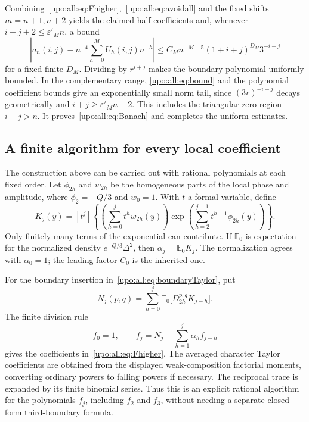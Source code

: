 \documentclass[11pt,letterpaper]{article}
\theoremstyle{remark}\newtheorem{remark}[theorem]{Remark}
\numberwithin{equation}{section}
\newcommand{\E}{\mathbb E}
\begin{document}
Combining~\eqref{upo:all:eq:Fhigher},~\eqref{upo:all:eq:avoidall} and the fixed shifts
$m=n+1,n+2$ yields the claimed half coefficients and, whenever
$i+j+2\le\varepsilon'_M n$, a bound
\[
\left|a_n(i,j)-n^{-4}\sum_{h=0}^M U_h(i,j)n^{-h}\right|
 \le C_Mn^{-M-5}(1+i+j)^{D_M}3^{-i-j}
\]
for a fixed finite $D_M$. Dividing by $r^{i+j}$ makes the boundary
polynomial uniformly bounded. In the complementary range,
\eqref{upo:all:eq:bound} and the polynomial coefficient bounds give an
exponentially small norm tail, since $(3r)^{-i-j}$ decays geometrically
and $i+j\ge\varepsilon'_Mn-2$. This includes the triangular zero region
$i+j>n$. It proves~\eqref{upo:all:eq:Banach} and completes the uniform estimates.


\subsection{A finite algorithm for every local coefficient}\label{upo:all:sec:algorithm}
The construction above can be carried out with rational polynomials
at each fixed order. Let $\phi_{2h}$ and $w_{2h}$ be the homogeneous
parts of the local phase and amplitude, where $\phi_2=-Q/3$ and
$w_0=1$. With $t$ a formal variable, define
\begin{equation}\label{upo:all:eq:Kalgorithm}
K_j(y)=[t^j]\left\{
 \left(\sum_{h=0}^j t^h w_{2h}(y)\right)
 \exp\left(\sum_{h=2}^{j+1}t^{h-1}\phi_{2h}(y)\right)
\right\}.
\end{equation}
Only finitely many terms of the exponential can contribute. If
$\E_0$ is expectation for the normalized density
$e^{-Q/3}\Delta^2$, then $\alpha_j=\E_0K_j$. The normalization agrees
with $\alpha_0=1$; the leading factor $C_0$ is the inherited one.

For the boundary insertion in~\eqref{upo:all:eq:boundaryTaylor}, put
\[
N_j(p,q)=\sum_{h=0}^j\E_0\bigl[D_{2h}^{p,q}K_{j-h}\bigr].
\]
The finite division rule
\begin{equation}\label{upo:all:eq:falgorithm}
f_0=1,\qquad
f_j=N_j-\sum_{h=1}^j\alpha_h f_{j-h}
\end{equation}
gives the coefficients in~\eqref{upo:all:eq:Fhigher}. The averaged character
Taylor coefficients are obtained from the displayed weak-composition
factorial moments, converting ordinary powers to falling powers if
necessary. The reciprocal trace is expanded by its finite binomial
series. Thus this is an explicit rational algorithm for the polynomials
$f_j$, including $f_2$ and $f_3$, without needing a separate closed-form
third-boundary formula.
\end{document}
